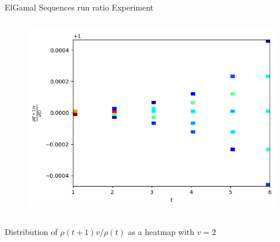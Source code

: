 \begin{frame}{ElGamal Sequences run ratio Experiment}
\begin{columns}
\begin{column}{0.45\textwidth}
\begin{figure}
                \includegraphics[width=\textwidth]{figures/v2AndvisGenNormalizedrunratio.png}
            \end{figure}
        \end{column}
    \end{columns}
    \begin{center}
                Distribution of $\rho(t+1)v/\rho(t)$ as a heatmap with $v = 2$
    \end{center}
\end{frame}